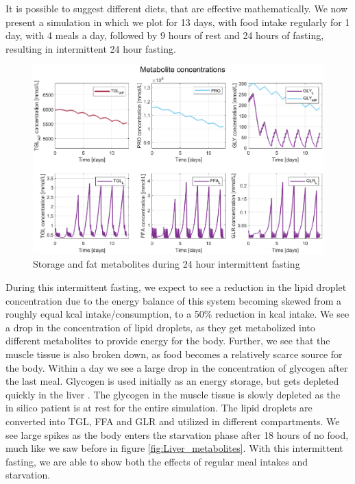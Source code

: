\documentclass{IEEEtran}
\begin{document}
It is possible to suggest different diets, that are effective mathematically. We now present a simulation in which we plot for 13 days, with food intake regularly for 1 day, with 4 meals a day, followed by 9 hours of rest and 24 hours of fasting, resulting in intermittent 24 hour fasting. 

\begin{figure}[H]
    \centering
    \includegraphics[trim=40 10 40 0, width=\columnwidth] {Diagrams/Food/metabolites_13_days_no_food_33_hours.eps}
    \caption{Storage and fat metabolites during 24 hour intermittent fasting}
    \label{fig:my_label}
\end{figure}

During this intermittent fasting, we expect to see a reduction in the lipid droplet concentration due to the energy balance of this system becoming skewed from a roughly equal kcal intake/consumption, to a 50\% reduction in kcal intake. We see a drop in the concentration of lipid droplets, as they get metabolized into different metabolites to provide energy for the body. Further, we see that the muscle tissue is also broken down, as food becomes a relatively scarce source for the body. Within a day we see a large drop in the concentration of glycogen after the last meal. Glycogen is used initially as an energy storage, but gets depleted quickly in the liver \cite{miesfeld_mcevoy_2017}. The glycogen in the muscle tissue is slowly depleted as the in silico patient is at rest for the entire simulation. The lipid droplets are converted into TGL, FFA and GLR and utilized in different compartments. We see large spikes as the body enters the starvation phase after 18 hours of no food, much like we saw before in figure \ref{fig:Liver_metabolites}. With this intermittent fasting, we are able to show both the effects of regular meal intakes and starvation. \\
\end{document}
